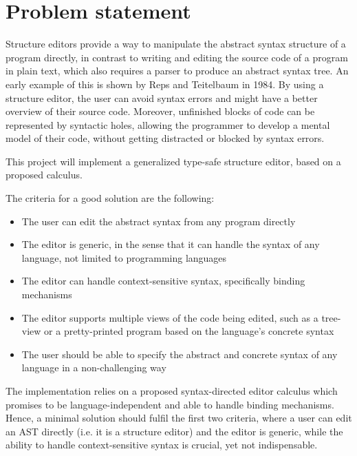 \section{Problem statement}
Structure editors provide a way to manipulate the abstract syntax structure of a program directly, in contrast to writing and editing the source code of a program in plain text, which also requires a parser to produce an abstract syntax tree. An early example of this is shown by Reps and Teitelbaum\cite{timtom84} in 1984.
By using a structure editor, the user can avoid syntax errors and might have a better overview of their source code. Moreover, unfinished blocks of code can be represented by syntactic holes, allowing the programmer to develop a mental model of their code, without getting distracted or blocked by syntax errors.

This project will implement a generalized type-safe structure editor, based on a proposed calculus\cite{aalborg}.

The criteria for a good solution are the following:

\begin{itemize}
    \item The user can edit the abstract syntax from any program directly
    \item The editor is generic, in the sense that it can handle the syntax of any language, not limited to programming languages
    \item The editor can handle context-sensitive syntax, specifically binding mechanisms
    \item The editor supports multiple views of the code being edited, such as a tree-view or a pretty-printed program based on the language's concrete syntax
    \item The user should be able to specify the abstract and concrete syntax of any language in a non-challenging way
\end{itemize}

The implementation relies on a proposed syntax-directed editor calculus\cite{aalborg} which promises to be language-independent and able to handle binding mechanisms. Hence, a minimal solution should fulfil the first two criteria, where a user can edit an AST directly (i.e. it is a structure editor) and the editor is generic, while the ability to handle context-sensitive syntax is crucial, yet not indispensable.

